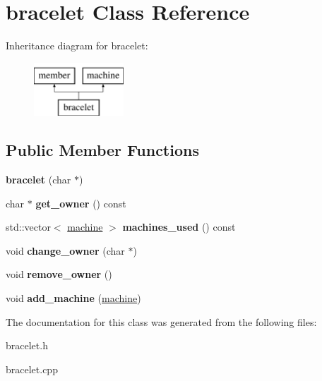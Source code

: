 \hypertarget{classbracelet}{\section{bracelet Class Reference}
\label{classbracelet}
}
Inheritance diagram for bracelet\-:\begin{figure}[H]
\begin{center}
\leavevmode
\includegraphics[height=2.000000cm]{classbracelet}
\end{center}
\end{figure}
\subsection*{Public Member Functions}
\begin{DoxyCompactItemize}
\item 
\hypertarget{classbracelet_a51b4e2907d3bd742bed3c5af8fb58e41}{{\bfseries bracelet} (char $\ast$)}\label{classbracelet_a51b4e2907d3bd742bed3c5af8fb58e41}

\item 
\hypertarget{classbracelet_a220850e5494aea041478ba50540ea58f}{char $\ast$ {\bfseries get\-\_\-owner} () const }\label{classbracelet_a220850e5494aea041478ba50540ea58f}

\item 
\hypertarget{classbracelet_a5df367d5e2c766f8070d892ed0735858}{std\-::vector$<$ \hyperlink{classmachine}{machine} $>$ {\bfseries machines\-\_\-used} () const }\label{classbracelet_a5df367d5e2c766f8070d892ed0735858}

\item 
\hypertarget{classbracelet_a7b27c0f1916a5a2ca1036e2f966ad431}{void {\bfseries change\-\_\-owner} (char $\ast$)}\label{classbracelet_a7b27c0f1916a5a2ca1036e2f966ad431}

\item 
\hypertarget{classbracelet_af335417478ad987d9df5521c430ac59d}{void {\bfseries remove\-\_\-owner} ()}\label{classbracelet_af335417478ad987d9df5521c430ac59d}

\item 
\hypertarget{classbracelet_a39485b59c215f4952da18b3bdb5aede0}{void {\bfseries add\-\_\-machine} (\hyperlink{classmachine}{machine})}\label{classbracelet_a39485b59c215f4952da18b3bdb5aede0}

\end{DoxyCompactItemize}


The documentation for this class was generated from the following files\-:\begin{DoxyCompactItemize}
\item 
bracelet.\-h\item 
bracelet.\-cpp\end{DoxyCompactItemize}
